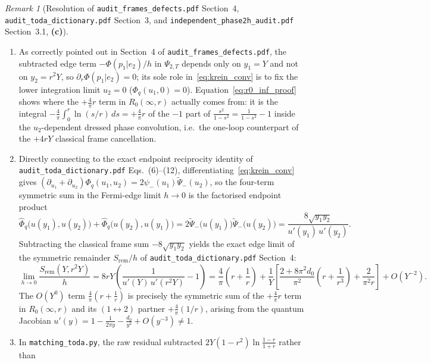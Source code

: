 \documentclass[11pt,a4paper]{article}
\newcommand{\Lc}{\textsf{\textbf{(c)}}}
\theoremstyle{remark}
\newtheorem{remark}[theorem]{Remark}
\begin{document}
\begin{remark}[Resolution of \texttt{audit\_\allowbreak frames\_\allowbreak defects.pdf} Section~4, \texttt{audit\_\allowbreak toda\_\allowbreak dictionary.pdf} Section~3, and \texttt{independent\_\allowbreak phase2h\_\allowbreak audit.pdf} Section~3.1, \Lc]
\begin{enumerate}
\item As correctly pointed out in Section~4 of \texttt{audit\_frames\_defects.pdf}, the subtracted edge
  term $-\Phi(p_1|e_2)/h$ in $\Psi_{2,T}$ depends only on $y_1 = Y$ and not on $y_2 = r^2 Y$, so
  $\partial_r\Phi(p_1|e_2) = 0$; its sole role in~\eqref{eq:krein_conv} is to fix the lower integration
  limit $u_2 = 0$ ($\Phi_q(u_1,0) = 0$). Equation~\eqref{eq:r0_inf_proof} shows where the $+\frac{4}{\pi}r$
  term in $R_0(\infty,r)$ actually comes from: it is the integral $-\frac{4}{\pi}\int_0^r \ln(s/r)\,ds = +\frac{4}{\pi}r$
  of the $-1$ part of $\frac{s^2}{1-s^2} = \frac{1}{1-s^2} - 1$ inside the $u_2$-dependent dressed phase
  convolution, i.e.\ the one-loop counterpart of the $+4rY$ classical frame cancellation.
\item Directly connecting to the exact endpoint reciprocity identity of \texttt{audit\_toda\_dictionary.pdf}
  Eqs.~(6)--(12), differentiating~\eqref{eq:krein_conv} gives
  $(\partial_{u_1}+\partial_{u_2})\Phi_q(u_1,u_2) = 2\psi_-(u_1)\widetilde{\Psi}_-(u_2)$, so the
  four-term symmetric sum in the Fermi-edge limit $h\to 0$ is the factorised endpoint product
  \[
    \widehat{\Phi}_q\big(u(y_1),u(y_2)\big) + \widehat{\Phi}_q\big(u(y_2),u(y_1)\big)
    = 2\widetilde{\Psi}_-\big(u(y_1)\big)\widetilde{\Psi}_-\big(u(y_2)\big)
    = \frac{8\sqrt{y_1 y_2}}{u'(y_1)\,u'(y_2)}.
  \]
  Subtracting the classical frame sum $-8\sqrt{y_1 y_2}$ yields the exact edge limit of the
  symmetric remainder $S_{\mathrm{rem}}/h$ of \texttt{audit\_toda\_dictionary.pdf} Section~4:
  \[
    \lim_{h\to 0}\frac{S_{\mathrm{rem}}(Y,r^2 Y)}{h}
    = 8rY\left(\frac{1}{u'(Y)\,u'(r^2 Y)} - 1\right)
    = \frac{4}{\pi}\left(r + \frac{1}{r}\right)
    + \frac{1}{Y}\left[\frac{2+8\pi^2 d_0}{\pi^2}\left(r + \frac{1}{r^3}\right) + \frac{2}{\pi^2 r}\right]
    + O(Y^{-2}).
  \]
  The $O(Y^0)$ term $\frac{4}{\pi}(r + \frac{1}{r})$ is precisely the symmetric sum of the $+\frac{4}{\pi}r$
  term in $R_0(\infty,r)$ and its $(1\leftrightarrow 2)$ partner $+\frac{4}{\pi}(1/r)$, arising from the
  quantum Jacobian $u'(y) = 1 - \frac{1}{2\pi y} - \frac{d_0}{y^2} + O(y^{-3}) \ne 1$.
\item In \texttt{matching\_toda.py}, the raw residual subtracted $2Y(1-r^2)\ln\frac{1-r}{1+r}$ rather than

\end{enumerate}
\end{remark}
\end{document}
